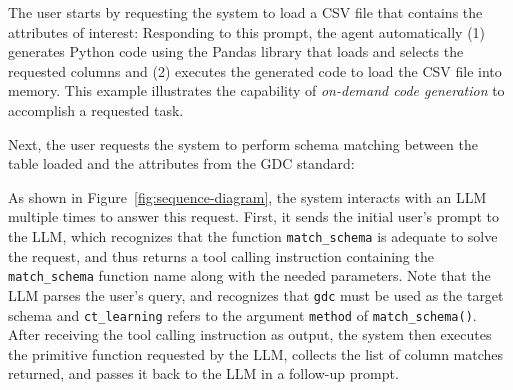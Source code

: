 The user starts by requesting the system to load a CSV file that contains the attributes of interest:
\vspace{-.5em}
\noindent Responding to this prompt, the agent automatically (1) generates Python code using the Pandas library that loads and selects the requested columns and (2) executes the generated code to load the CSV file into memory. This example illustrates the capability of \textit{on-demand code generation} to accomplish a requested task.

Next, the user requests the system to perform schema matching between the table loaded and the attributes from the GDC standard:


\noindent
As shown in Figure~\ref{fig:sequence-diagram}, the system interacts with an LLM multiple times to answer this request. First, it sends the initial user's prompt to the LLM, which recognizes that the function \texttt{match\_schema} is adequate to solve the request, and thus returns a tool calling instruction containing the \texttt{match\_schema} function name along with the needed parameters. Note that the LLM parses the user's query, and recognizes that \texttt{gdc} must be used as the target schema and \texttt{ct\_learning} refers to the argument \texttt{method} of \texttt{match\_schema()}. 
% 
After receiving the tool calling instruction as output, the system then executes the primitive function requested by the LLM, collects the list of column matches returned, and passes it back to the LLM in a follow-up prompt. 

